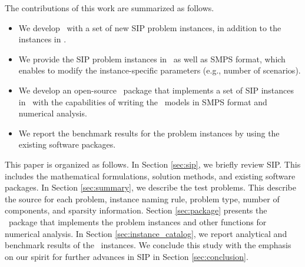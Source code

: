 The contributions of this work are summarized as follows.
\begin{itemize}
	\item We develop \siplibtwo\ with a set of new SIP problem instances, in addition to the instances in \siplib.
	\item We provide the SIP problem instances in \julia\, as well as SMPS format, which enables to modify the instance-specific parameters (e.g., number of scenarios).
	\item We develop an open-source \julia\ package that implements a set of SIP instances in \julia\ with the capabilities of writing the \julia\ models in SMPS format and numerical analysis.
	\item We report the benchmark results for the problem instances by using the existing software packages.
\end{itemize}


This paper is organized as follows. In Section \ref{sec:sip}, we briefly review SIP. This 
includes the mathematical formulations, solution methods, and existing software 
packages. In Section \ref{sec:summary}, we describe the test 
problems. This describe the source for each problem, instance naming 
rule, problem type, number of components, and sparsity information. Section \ref{sec:package} presents the \julia\ package that implements the problem instances and other functions for numerical analysis. In Section \ref{sec:instance_catalog}, we report analytical and 
benchmark results of the \smps\ instances. We conclude this study with the 
emphasis on our spirit for further advances in SIP in Section \ref{sec:conclusion}. 







